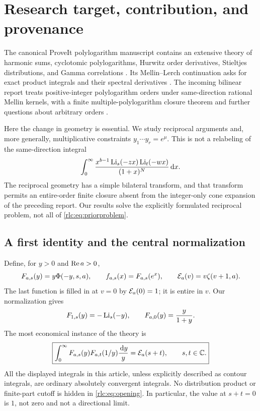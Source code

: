 \section{Research target, contribution, and provenance}
\label{rlc:sec:scope}

The canonical ProveIt polylogarithm manuscript contains an extensive theory of harmonic sums, cyclotomic
polylogarithms, Hurwitz order derivatives, Stieltjes distributions,
and Gamma correlations \cite{Repo}. Its Mellin--Lerch continuation asks
for exact product integrals and their spectral derivatives \cite{MLD}.
The incoming bilinear report treats positive-integer polylogarithm
orders under same-direction rational Mellin kernels, with a finite
multiple-polylogarithm closure theorem and further questions about
arbitrary orders \cite{BMH}.

Here the change in geometry is essential. We study reciprocal arguments
and, more generally, multiplicative constraints
$y_1\cdots y_r=e^\mu$. This is not a relabeling of the same-direction
integral
\begin{equation}\label{rlc:eq:priorproblem}
 \int_0^\infty \frac{x^{b-1}\operatorname{Li}_s(-zx)\operatorname{Li}_t(-wx)}{(1+x)^N}\,\mathrm d x.
\end{equation}
The reciprocal geometry has a simple bilateral transform, and that
transform permits an entire-order finite closure absent from the
integer-only cone expansion of the preceding report. Our results
solve the explicitly formulated reciprocal problem, not all of
\eqref{rlc:eq:priorproblem}.

\subsection{A first identity and the central normalization}
Define, for $y>0$ and $\operatorname{Re} a>0$,
\begin{equation}\label{rlc:eq:profile}
 F_{a,s}(y)=y\Phi(-y,s,a),\qquad
 f_{a,s}(x)=F_{a,s}(e^x),\qquad
 \mathcal E_a(v)=v\zeta(v+1,a).
\end{equation}
The last function is filled in at $v=0$ by $\mathcal E_a(0)=1$; it is entire
in $v$. Our normalization gives
\begin{equation}\label{rlc:eq:specialprofiles}
 F_{1,s}(y)=-\operatorname{Li}_s(-y),\qquad
 F_{a,0}(y)=\frac{y}{1+y}.
\end{equation}
The most economical instance of the theory is
\begin{equation}\label{rlc:eq:opening}
 \boxed{\displaystyle
 \int_0^\infty F_{a,s}(y)F_{a,t}(1/y)\frac{\,\mathrm d y}{y}
      =\mathcal E_a(s+t),\qquad s,t\in\mathbb C.}
\end{equation}
All the displayed integrals in this article, unless explicitly described
as contour integrals, are ordinary absolutely convergent integrals.
No distribution product or finite-part cutoff is hidden in
\eqref{rlc:eq:opening}. In particular, the value at $s+t=0$ is $1$, not
zero and not a directional limit.

